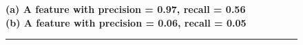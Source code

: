\label{sec:n2g}



\begin{figure}[t]
\newcommand\dunderline[3][-1pt]{{%
  \sbox0{#3}%
  \ooalign{\copy0\cr\rule[\dimexpr#1-#2\relax]{\wd0}{#2}}}}
\newcommand{\hlc}[2][yellow]{%
    \ifx\relax#1\relax%
        \colorlet{foo}{yellow}%
    \else
        \definecolor{foo}{HTML}{#1}%
    \fi
    \sethlcolor{foo}%
    \hl{#2}%
}
\begin{multicols}{2}
    \small
    \raggedright
    \textbf{(a) A feature with precision = 0.97, recall = 0.56} \\
    \textbf{(b) A feature with precision = 0.06, recall = 0.05}
\end{multicols}

\hrule
\vspace{-12pt}
\setlength{\columnseprule}{0.4pt} %


\end{figure}
